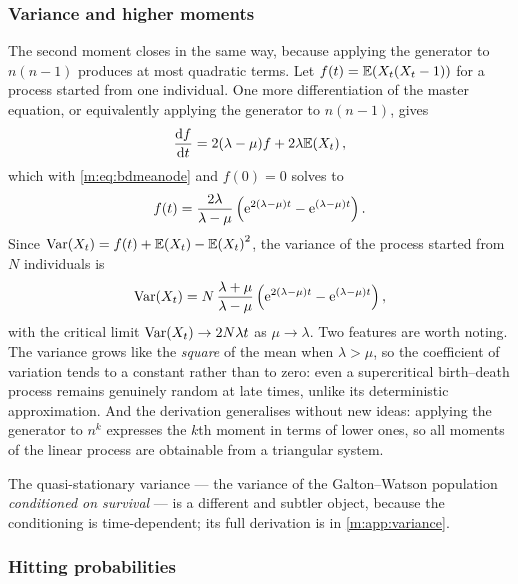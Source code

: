 \subsubsection{Variance and higher moments}
\label{m:sec:ctvar}

The second moment closes in the same way, because applying the generator to
$n(n-1)$ produces at most quadratic terms. Let $f(t)=\mathbb{E}\!\left(X_t(X_t-1)\right)$ for a
process started from one individual. One more differentiation of the master
equation, or equivalently applying the generator to $n(n-1)$, gives
\begin{equation*}
\frac{\mathrm{d} f}{\mathrm{d} t} = 2(\lambda-\mu)f + 2\lambda\mathbb{E}\!\left(X_t\right),
\end{equation*}
which with \cref{m:eq:bdmeanode} and $f(0)=0$ solves to
\begin{equation*}
f(t) = \frac{2\lambda}{\lambda-\mu}\left(\mathrm{e}^{2(\lambda-\mu)t}-\mathrm{e}^{(\lambda-\mu)t}\right) .
\end{equation*}
Since $\operatorname{Var}\!\left(X_t\right) = f(t)+\mathbb{E}\!\left(X_t\right)-\mathbb{E}\!\left(X_t\right)^2$, the variance of the process
started from $N$ individuals is
\begin{equation}
\label{m:eq:bdvar}
\operatorname{Var}\!\left(X_t\right) = N\,\frac{\lambda+\mu}{\lambda-\mu}
\left(\mathrm{e}^{2(\lambda-\mu)t}-\mathrm{e}^{(\lambda-\mu)t}\right),
\end{equation}
with the critical limit $\operatorname{Var}\!\left(X_t\right)\to2N\lambda t$ as $\mu\to\lambda$. Two
features are worth noting. The variance grows like the \emph{square} of the
mean when $\lambda>\mu$, so the coefficient of variation tends to a constant
rather than to zero: even a supercritical birth--death process remains
genuinely random at late times, unlike its deterministic approximation. And
the derivation generalises without new ideas: applying the generator to $n^k$
expresses the $k$th moment in terms of lower ones, so all moments of the linear
process are obtainable from a triangular system.

The quasi-stationary variance --- the variance of the Galton--Watson population
\emph{conditioned on survival} --- is a different and subtler object, because
the conditioning is time-dependent; its full derivation is in
\cref{m:app:variance}.

\subsubsection{Hitting probabilities}
\label{m:sec:hittingct}

